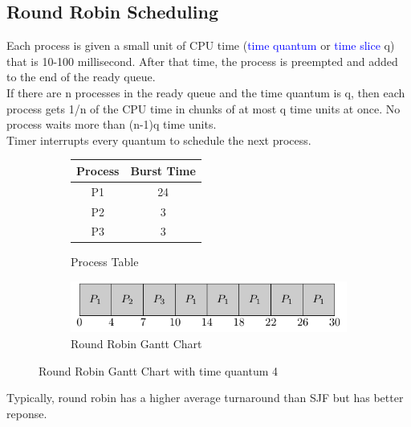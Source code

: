 \documentclass{book/custombook}
\begin{document}
            \subsection{Round Robin Scheduling}
                Each process is given a small unit of CPU time (\textcolor{blue}{time quantum} or \textcolor{blue}{time slice} q) that
                is 10-100 millisecond.
                After that time, the process is preempted and added to the end of the ready queue.\\
                If there are n processes in the ready queue and the time quantum is q, then each process
                gets 1/n of the CPU time in chunks of at most q time units at once. No process waits more
                than (n-1)q time units.\\
                Timer interrupts every quantum to schedule the next process.\\
                \begin{figure}[H]
                    \centering
                    \begin{subfigure}{0.5\linewidth}
                        \centering
                        \begin{tabular}{cc}
                            Process & Burst Time\\
                            \toprule
                            P1 & 24\\
                            P2 & 3\\
                            P3 & 3\\
                        \end{tabular}
                        \caption{Process Table}
                    \end{subfigure}%
                    \begin{subfigure}{0.5\linewidth}
                        \centering
                        \includegraphics{figures/rr_time_quant_4.pdf}
                        \caption{Round Robin Gantt Chart}
                    \end{subfigure}
                    \caption{Round Robin Gantt Chart with time quantum 4}
                \end{figure}
                Typically, round robin has a higher average turnaround than SJF but has better reponse.
\end{document}
